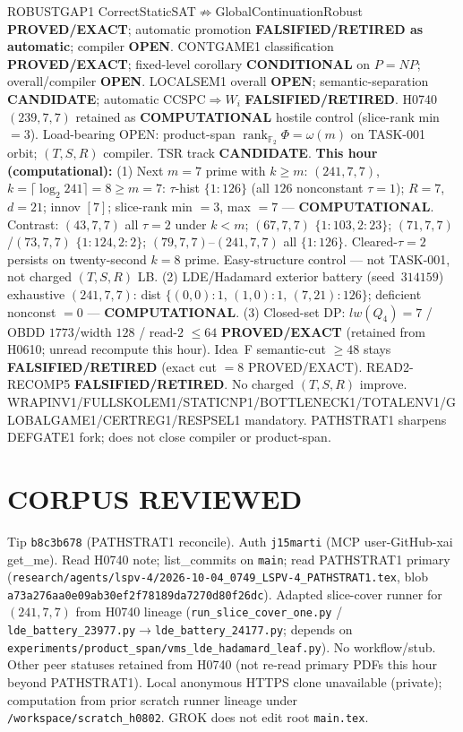 \documentclass[11pt]{article}
\begin{document}
ROBUSTGAP1 CorrectStaticSAT$\not\Rightarrow$GlobalContinuationRobust \textbf{PROVED/EXACT};
automatic promotion \textbf{FALSIFIED/RETIRED as automatic}; compiler \textbf{OPEN}.
CONTGAME1 classification \textbf{PROVED/EXACT}; fixed-level corollary \textbf{CONDITIONAL} on $P=NP$;
overall/compiler \textbf{OPEN}.
LOCALSEM1 overall \textbf{OPEN}; semantic-separation \textbf{CANDIDATE}; automatic CCSPC$\Rightarrow W_i$
\textbf{FALSIFIED/RETIRED}.
H0740 $(239,7,7)$ retained as \textbf{COMPUTATIONAL} hostile control (slice-rank min $=3$).
Load-bearing OPEN: product-span $\operatorname{rank}_{\mathbb F_2}\Phi=\omega(m)$ on TASK-001 orbit;
$(T,S,R)$ compiler. TSR track \textbf{CANDIDATE}.
\textbf{This hour (computational):}
(1) Next $m{=}7$ prime with $k{\ge}m$: $(241,7,7)$, $k=\lceil\log_2 241\rceil=8{\ge}m{=}7$:
$\tau$-hist $\{1{:}126\}$ (all $126$ nonconstant $\tau{=}1$); $R{=}7$, $d{=}21$; innov $[7]$;
slice-rank min $=3$, max $=7$ --- \textbf{COMPUTATIONAL}.
Contrast: $(43,7,7)$ all $\tau{=}2$ under $k{<}m$; $(67,7,7)$ $\{1{:}103,2{:}23\}$;
$(71,7,7)$/$(73,7,7)$ $\{1{:}124,2{:}2\}$; $(79,7,7)$--$(241,7,7)$ all $\{1{:}126\}$.
Cleared-$\tau{=}2$ persists on twenty-second $k{=}8$ prime. Easy-structure control --- not TASK-001,
not charged $(T,S,R)$ LB.
(2) LDE/Hadamard exterior battery (seed~$314159$) exhaustive $(241,7,7)$:
dist $\{(0,0){:}1,\,(1,0){:}1,\,(7,21){:}126\}$; deficient nonconst $=0$ --- \textbf{COMPUTATIONAL}.
(3) Closed-set DP: $lw(Q_4)=7$ / OBDD $1773$/width $128$ / read-$2$ $\le64$
\textbf{PROVED/EXACT} (retained from H0610; unread recompute this hour).
Idea~F semantic-cut $\ge48$ stays \textbf{FALSIFIED/RETIRED} (exact cut $=8$ PROVED/EXACT).
READ2-RECOMP5 \textbf{FALSIFIED/RETIRED}. No charged $(T,S,R)$ improve.
WRAPINV1/FULLSKOLEM1/STATICNP1/BOTTLENECK1/TOTALENV1/GLOBALGAME1/CERTREG1/RESPSEL1 mandatory.
PATHSTRAT1 sharpens DEFGATE1 fork; does not close compiler or product-span.

\section*{CORPUS REVIEWED}
Tip \texttt{b8c3b678} (PATHSTRAT1 reconcile). Auth \texttt{j15marti} (MCP user-GitHub-xai get\_me).
Read H0740 note; list\_commits on \texttt{main}; read PATHSTRAT1 primary
(\texttt{research/agents/lspv-4/2026-10-04\_0749\_LSPV-4\_PATHSTRAT1.tex}, blob \texttt{a73a276aa0e09ab30ef2f78189da7270d80f26dc}).
Adapted slice-cover runner for $(241,7,7)$ from H0740 lineage
(\texttt{run\_slice\_cover\_one.py} / \texttt{lde\_battery\_23977.py}$\to$\texttt{lde\_battery\_24177.py};
depends on \texttt{experiments/product\_span/vms\_lde\_hadamard\_leaf.py}).
No workflow/stub. Other peer statuses retained from H0740 (not re-read primary PDFs this hour beyond PATHSTRAT1).
Local anonymous HTTPS clone unavailable (private);
computation from prior scratch runner lineage under \texttt{/workspace/scratch\_h0802}.
GROK does not edit root \texttt{main.tex}.
\end{document}
